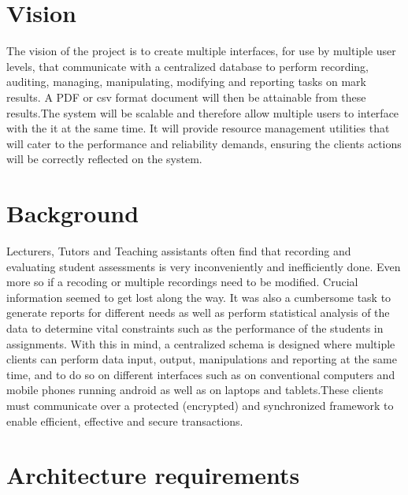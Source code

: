 \documentclass[10pt,a4paper]{article}
\begin{document}
\section{Vision}
The vision of the project is to create multiple interfaces, for use by multiple user levels, that communicate with a centralized database to perform recording, auditing, managing, manipulating, modifying and reporting tasks on mark results. A PDF or csv format document will then be attainable from these results.\linebreak The system will be scalable and therefore allow multiple users to interface with the it at the same time. It will provide resource management utilities that will cater to the performance and reliability demands, ensuring the clients actions will be correctly reflected on the system.

\section{Background}
Lecturers, Tutors and Teaching assistants often find that recording and evaluating student assessments is very inconveniently and inefficiently done. Even more so if a recoding or multiple recordings need to be modified. Crucial information seemed to get lost along the way.\linebreak
It was also a cumbersome task to generate reports for different needs as well as perform statistical analysis of the data to determine vital constraints such as the performance of the students in assignments. \linebreak
With this in mind, a centralized schema is designed where multiple clients can perform data input, output, manipulations and reporting at the same time, and to do so on different interfaces such as on conventional computers and mobile phones running android as well as on laptops and tablets.\linebreak These clients must communicate over a protected (encrypted) and synchronized framework to enable efficient, effective and secure transactions. 

\pagebreak
\section{Architecture requirements}
\end{document}

